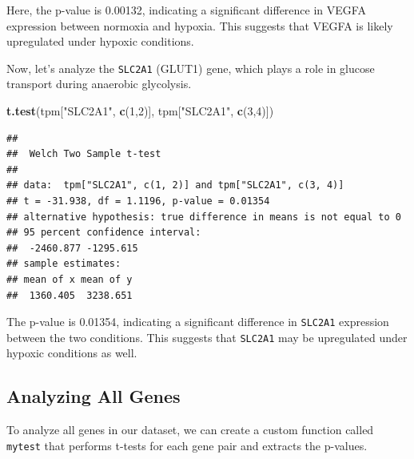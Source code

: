 \documentclass[
]{book}
\newenvironment{Shaded}{\begin{snugshade}}{\end{snugshade}}
\newcommand{\AttributeTok}[1]{\textcolor[rgb]{0.13,0.29,0.53}{#1}}
\newcommand{\ConstantTok}[1]{\textcolor[rgb]{0.56,0.35,0.01}{#1}}
\newcommand{\ControlFlowTok}[1]{\textcolor[rgb]{0.13,0.29,0.53}{\textbf{#1}}}
\newcommand{\DecValTok}[1]{\textcolor[rgb]{0.00,0.00,0.81}{#1}}
\newcommand{\FunctionTok}[1]{\textcolor[rgb]{0.13,0.29,0.53}{\textbf{#1}}}
\newcommand{\NormalTok}[1]{#1}
\newcommand{\OtherTok}[1]{\textcolor[rgb]{0.56,0.35,0.01}{#1}}
\newcommand{\SpecialCharTok}[1]{\textcolor[rgb]{0.81,0.36,0.00}{\textbf{#1}}}
\newcommand{\StringTok}[1]{\textcolor[rgb]{0.31,0.60,0.02}{#1}}
\begin{document}
Here, the p-value is 0.00132, indicating a significant difference in VEGFA expression between normoxia and hypoxia. This suggests that VEGFA is likely upregulated under hypoxic conditions.

Now, let's analyze the \texttt{SLC2A1} (GLUT1) gene, which plays a role in glucose transport during anaerobic glycolysis.

\begin{Shaded}
\begin{Highlighting}[]
\FunctionTok{t.test}\NormalTok{(tpm[}\StringTok{"SLC2A1"}\NormalTok{, }\FunctionTok{c}\NormalTok{(}\DecValTok{1}\NormalTok{,}\DecValTok{2}\NormalTok{)], tpm[}\StringTok{"SLC2A1"}\NormalTok{, }\FunctionTok{c}\NormalTok{(}\DecValTok{3}\NormalTok{,}\DecValTok{4}\NormalTok{)])}
\end{Highlighting}
\end{Shaded}

\begin{verbatim}
## 
##  Welch Two Sample t-test
## 
## data:  tpm["SLC2A1", c(1, 2)] and tpm["SLC2A1", c(3, 4)]
## t = -31.938, df = 1.1196, p-value = 0.01354
## alternative hypothesis: true difference in means is not equal to 0
## 95 percent confidence interval:
##  -2460.877 -1295.615
## sample estimates:
## mean of x mean of y 
##  1360.405  3238.651
\end{verbatim}

The p-value is 0.01354, indicating a significant difference in \texttt{SLC2A1} expression between the two conditions. This suggests that \texttt{SLC2A1} may be upregulated under hypoxic conditions as well.

\hypertarget{analyzing-all-genes}{%
\subsection{Analyzing All Genes}\label{analyzing-all-genes}}

To analyze all genes in our dataset, we can create a custom function called \texttt{mytest} that performs t-tests for each gene pair and extracts the p-values.

\begin{Shaded}
\end{Shaded}
\end{document}
